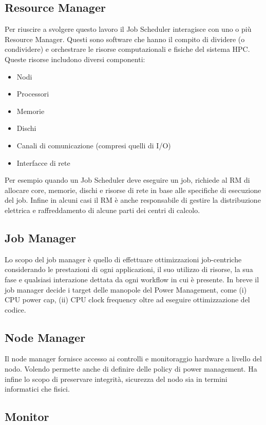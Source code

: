 \subsection{Resource Manager}
Per riuscire a svolgere questo lavoro il Job Scheduler interagisce con uno o più Resource Manager. Questi sono software che hanno il compito di dividere (o condividere) e orchestrare le risorse computazionali e fisiche del sistema HPC. Queste risorse includono diversi componenti:
\begin{itemize}
    \item Nodi
    \item Processori
    \item Memorie
    \item Dischi
    \item Canali di comunicazione (compresi quelli di I/O)
    \item Interfacce di rete 
\end{itemize}
Per esempio quando un Job Scheduler deve eseguire un job, richiede al RM di allocare core, memorie, dischi e risorse di rete in base alle specifiche di esecuzione del job.
Infine in alcuni casi il RM è anche responsabile di gestire la distribuzione elettrica e raffreddamento di alcune parti dei centri di calcolo\cite{ResourceManager}.

\subsection{Job Manager}
Lo scopo del job manager è quello di effettuare ottimizzazioni job-centriche considerando le prestazioni di ogni applicazioni, il suo utilizzo di risorse, la sua fase e qualsiasi interazione dettata da ogni workflow in cui è presente. In breve il job manager decide i target delle manopole del Power Management, come (i) CPU power cap, (ii) CPU clock frequency oltre ad eseguire ottimizzazione del codice.

\subsection{Node Manager}
Il node manager fornisce accesso ai controlli e monitoraggio hardware a livello del nodo. Volendo permette anche di definire delle policy di power management. Ha infine lo scopo di preservare integrità, sicurezza del nodo sia in termini informatici che fisici.

\subsection{Monitor}

